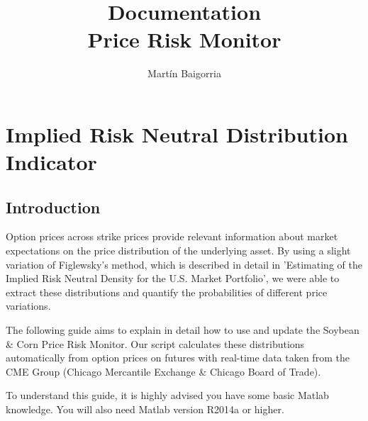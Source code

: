 \documentclass[10pt,a4paper]{book}
\author{Mart\'in Baigorria}
\title{Documentation \\ Price Risk Monitor}
\begin{document}
\maketitle

\chapter{Implied Risk Neutral Distribution Indicator}
\section{Introduction}
Option prices across strike prices provide relevant information about market expectations on the price distribution of the underlying asset. By using a slight variation of Figlewsky's method, which is described in detail in 'Estimating of the Implied Risk Neutral Density for the U.S. Market Portfolio', we were able to extract these distributions and quantify the probabilities of different price variations.

The following guide aims to explain in detail how to use and update the Soybean \& Corn Price Risk Monitor. Our script calculates these distributions automatically from option prices on futures with real-time data taken from the CME Group (Chicago Mercantile Exchange \& Chicago Board of Trade).

To understand this guide, it is highly advised you have some basic Matlab knowledge. You will also need Matlab version R2014a or higher.
\end{document}
